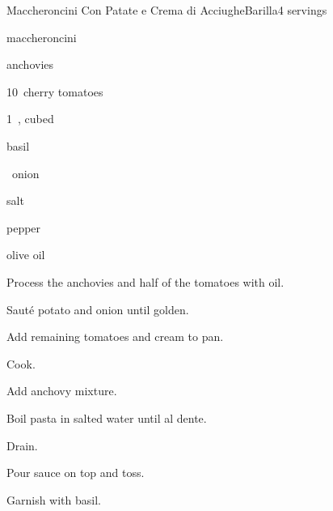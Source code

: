 \begin{recipe}{Maccheroncini Con Patate e Crema di Acciughe}{Barilla}{4 servings}

\begin{ingredients}
\item {} maccheroncini
\item {} anchovies
\item 10~cherry tomatoes
\item 1~, cubed
\item basil
\item {} 
\item \half~onion
\item salt
\item pepper
\item olive oil
\end{ingredients}

\begin{directions}
\item Process the anchovies and half of the tomatoes with oil.
\item Saut\'e potato and onion until golden.
\item Add remaining tomatoes and cream to pan.
\item Cook.
\item Add anchovy mixture.
\item Boil pasta in salted water until al dente.
\item Drain.
\item Pour sauce on top and toss.
\item Garnish with basil.
\end{directions}

\end{recipe}
